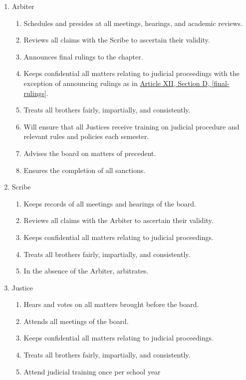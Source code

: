 	\begin{enumerate}

		\item Arbiter
			\begin{enumerate}
				\item Schedules and presides at all meetings, hearings, and academic reviews.
				\item Reviews all claims with the Scribe to ascertain their validity.
				\item Announces final rulings to the chapter. \label{final-rulings}
				\item Keeps confidential all matters relating to judicial proceedings with the exception of announcing rulings as in \hyperref[final-rulings]{Article XII, Section D, \autoref*{final-rulings}}. 
				\item Treats all brothers fairly, impartially, and consistently.
				\item Will ensure that all Justices receive training on judicial procedure and relevant rules and policies each semester.
				\item Advises the board on matters of precedent.
				\item Ensures the completion of all sanctions.
			\end{enumerate}

		\item Scribe
			\begin{enumerate}
				\item Keeps records of all meetings and hearings of the board.
				\item Reviews all claims with the Arbiter to ascertain their validity.
				\item Keeps confidential all matters relating to judicial proceedings.
				\item Treats all brothers fairly, impartially, and consistently.
				\item In the absence of the Arbiter, arbitrates.
			\end{enumerate}

		\item Justice
			\begin{enumerate}
				\item Hears and votes on all matters brought before the board.
				\item Attends all meetings of the board.
				\item Keeps confidential all matters relating to judicial proceedings.
				\item Treats all brothers fairly, impartially, and consistently.
				\item Attend judicial training once per school year 
			\end{enumerate}


\end{enumerate}
